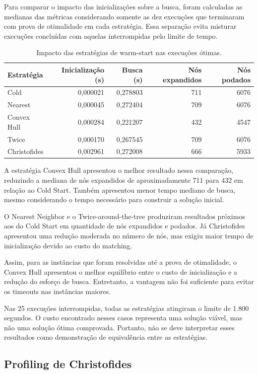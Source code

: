 \documentclass[12pt]{article}
\begin{document}
Para comparar o impacto das inicializações sobre a busca, foram calculadas as medianas das métricas considerando somente as dez execuções que terminaram com prova de otimalidade em cada estratégia. Essa separação evita misturar execuções concluídas com aquelas interrompidas pelo limite de tempo.

\begin{table}[H]
\centering
\caption{Impacto das estratégias de warm-start nas execuções ótimas.}
\label{tab:warmstart}
\small
\begin{tabular}{lrrrr}
\toprule
Estratégia & Inicialização (s) & Busca (s) & Nós expandidos & Nós podados\\
\midrule
Cold & 0,000021 & 0,278803 & 711 & 6076\\
Nearest & 0,000045 & 0,272404 & 709 & 6076\\
Convex Hull & 0,000284 & 0,221207 & 432 & 4547\\
Twice & 0,000170 & 0,267545 & 709 & 6076\\
Christofides & 0,002961 & 0,272008 & 666 & 5933\\
\bottomrule
\end{tabular}
\end{table}

A estratégia Convex Hull apresentou o melhor resultado nessa comparação, reduzindo a mediana de nós expandidos de aproximadamente 711 para 432 em relação ao Cold Start. Também apresentou menor tempo mediano de busca, mesmo considerando o tempo necessário para construir a solução inicial.

O Nearest Neighbor e o Twice-around-the-tree produziram resultados próximos aos do Cold Start em quantidade de nós expandidos e podados. Já Christofides apresentou uma redução moderada no número de nós, mas exigiu maior tempo de inicialização devido ao custo do matching.

Assim, para as instâncias que foram resolvidas até a prova de otimalidade, o Convex Hull apresentou o melhor equilíbrio entre o custo de inicialização e a redução do esforço de busca. Entretanto, a vantagem não foi suficiente para evitar os timeouts nas instâncias maiores.

Nas 25 execuções interrompidas, todas as estratégias atingiram o limite de 1.800 segundos. O custo encontrado nesses casos representa uma solução viável, mas não uma solução ótima comprovada. Portanto, não se deve interpretar esses resultados como demonstração de equivalência entre as estratégias.


\subsection{Profiling de Christofides}
\end{document}
